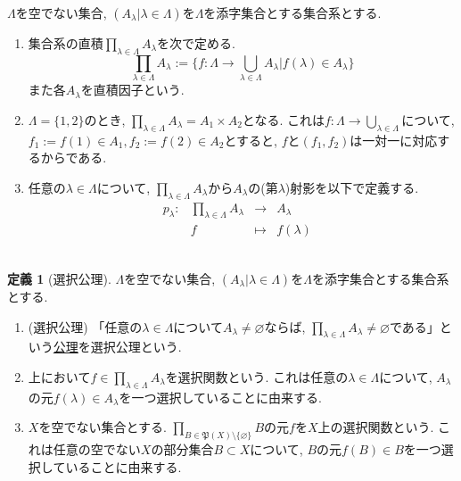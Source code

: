 \documentclass[dvipdfmx,a4paper,11pt]{article}
\theoremstyle{definition}
\newtheorem{dfn}[thm]{定義}
\begin{document}
\begin{tcolorbox}[
    colback = white,
    colframe = black!35!black,
    fonttitle = \bfseries,
    breakable = true]
    $\Lambda$を空でない集合, $(A_{\lambda} | \lambda \in \Lambda)$を$\Lambda$を添字集合とする集合系とする. 
    \begin{enumerate}
    \setlength{\parskip}{0cm} 
  \setlength{\itemsep}{0cm} 
  \item 集合系の直積$\prod_{\lambda \in \Lambda} A_{\lambda}$を次で定める.
  $$
  \prod_{\lambda \in \Lambda} A_{\lambda}
  :=\{  f : \Lambda \to \bigcup_{\lambda \in \Lambda}A_{\lambda} | f(\lambda) \in A_{\lambda}\}
  $$
  また各$A_{\lambda}$を直積因子という. 
  \item $\Lambda = \{ 1, 2\}$のとき, $\prod_{\lambda \in \Lambda} A_{\lambda}=A_1 \times A_2$となる. これは$f : \Lambda \to \bigcup_{\lambda \in \Lambda} $について, $f_1 :=f(1) \in A_1, f_2:=f(2) \in A_2$とすると, $f$と$(f_1, f_2)$は一対一に対応するからである. 
\item 任意の$\lambda \in \Lambda$について, $ \prod_{\lambda \in \Lambda} A_{\lambda}$から$A_{\lambda}$の(第$\lambda$)射影を以下で定義する. 
$$
\begin{array}{ccccc}
p_{\lambda} : &\prod_{\lambda \in \Lambda} A_{\lambda}& \rightarrow &A_{\lambda}& \\
&f& \longmapsto & 
f(\lambda)
 &
\end{array}
$$　
   \end{enumerate}
 \end{tcolorbox}
 
 
\begin{tcolorbox}[
    colback = white,
    colframe = black!35!black,
    fonttitle = \bfseries,
    breakable = true]
    \begin{dfn}[選択公理]
    $\Lambda$を空でない集合, $(A_{\lambda} | \lambda \in \Lambda)$を$\Lambda$を添字集合とする集合系とする. 
    \begin{enumerate}
    \setlength{\parskip}{0cm} 
  \setlength{\itemsep}{0cm} 
  \item (選択公理) 「任意の$\lambda \in \Lambda$について$A_{\lambda} \neq \varnothing$ならば, $\prod_{\lambda \in \Lambda} A_{\lambda} \neq \varnothing$である」という\underline{公理}を選択公理という.
  \item 上において$f \in \prod_{\lambda \in \Lambda} A_{\lambda}$を選択関数という. これは任意の$\lambda \in \Lambda$について, $A_{\lambda}$の元$f(\lambda) \in A_{\lambda}$を一つ選択していることに由来する.
  \item $X$を空でない集合とする. $\prod_{B \in \mathfrak{P}(X) \setminus \{ \varnothing\}} B$の元$f$を$X$上の選択関数という. 
  これは任意の空でない$X$の部分集合$B \subset X$について, $B$の元$f(B) \in B$を一つ選択していることに由来する. 
  \end{enumerate}
    \end{dfn}
 \end{tcolorbox}
 
\end{document}
